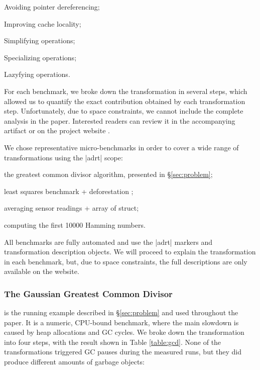 \begin{compactitem}
  \item Avoiding pointer dereferencing;
  \item Improving cache locality;
  \item Simplifying operations;
  \item Specializing operations;
  \item Lazyfying operations.
\end{compactitem}

\vspace{0.5em}
\noindent
For each benchmark, we broke down the transformation in several steps, which allowed us to quantify the exact contribution obtained by each transformation step. Unfortunately, due to space constraints, we cannot include the complete analysis in the paper. Interested readers can review it in the accompanying artifact or on the project website \cite{ildl-plugin-wiki}.

\vspace{0.5em}
\noindent
We chose representative micro-benchmarks in order to cover a wide range of transformations using the |adrt| scope:

\begin{compactitem}
\item the greatest common divisor algorithm, presented in \S\ref{sec:problem};
\item least squares benchmark + deforestation \cite{wadler-deforestation};
\item averaging sensor readings + array of struct;
\item computing the first 10000 Hamming numbers.
\end{compactitem}

\vspace{0.5em}
\noindent
All benchmarks are fully automated and use the |adrt| markers and transformation description objects. We will proceed to explain the transformation in each benchmark, but, due to space constraints, the full descriptions are only available on the website.

\subsubsection{The Gaussian Greatest Common Divisor}
is the running example described in \S\ref{sec:problem} and used throughout the paper. It is a numeric, CPU-bound benchmark, where the main slowdown is caused by heap allocations and GC cycles. We broke down the transformation into four steps, with the result shown in Table \ref{table:gcd}. None of the transformations triggered GC pauses during the measured runs, but they did produce different amounts of garbage objects:

